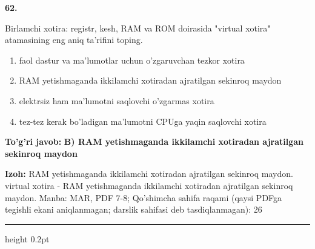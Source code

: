 \documentclass[10pt,a4paper]{article}
\begin{document}
{\bfseries\sffamily\color{ink} 62.}
\par
Birlamchi xotira: registr, kesh, RAM va ROM doirasida "virtual xotira" atamasining eng aniq ta'rifini toping.
\begin{enumerate}[label=\Alph*),leftmargin=9mm]
\item faol dastur va ma'lumotlar uchun o'zgaruvchan tezkor xotira
\item RAM yetishmaganda ikkilamchi xotiradan ajratilgan sekinroq maydon
\item elektrsiz ham ma'lumotni saqlovchi o'zgarmas xotira
\item tez-tez kerak bo'ladigan ma'lumotni CPUga yaqin saqlovchi xotira
\end{enumerate}
\begin{tcolorbox}[enhanced,breakable,colback=teal!4,colframe=teal!60!black,boxrule=0.45pt,arc=1.2mm,left=2.7mm,right=2.7mm,top=1.8mm,bottom=1.8mm,before skip=2mm,after skip=2mm]
{\bfseries\sffamily\color{teal}To'g'ri javob:} \textbf{B) RAM yetishmaganda ikkilamchi xotiradan ajratilgan sekinroq maydon}
\par\smallskip
{\bfseries Izoh:} RAM yetishmaganda ikkilamchi xotiradan ajratilgan sekinroq maydon. virtual xotira - RAM yetishmaganda ikkilamchi xotiradan ajratilgan sekinroq maydon. Manba: MAR, PDF 7-8; Qo'shimcha sahifa raqami (qaysi PDFga tegishli ekani aniqlanmagan; darslik sahifasi deb tasdiqlanmagan): 26
\end{tcolorbox}
\vspace{2mm}\hrule height 0.2pt\vspace{3mm}
\end{document}
